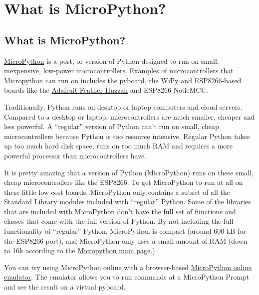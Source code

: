 \documentclass{book}
\begin{document}
    




    
        \section{What is MicroPython?}\label{what-is-micropython}
    




    
        \subsection{What is MicroPython?}\label{what-is-micropython}
    




    
        \href{http://micropython.org/}{MicroPython} is a port, or version of
Python designed to run on small, inexpensive, low-power
microcontrollers. Examples of microcontrollers that Micropython can run
on includes the \href{https://store.micropython.org/}{pyboard}, the
\href{https://pycom.io/development-boards}{WiPy} and ESP8266-based
boards like the
\href{https://learn.adafruit.com/adafruit-feather-huzzah-esp8266}{Adafruit
Feather Huzzah} and ESP8266 NodeMCU.

Traditionally, Python runs on desktop or laptop computers and cloud
servers. Compared to a desktop or laptop, microcontrollers are much
smaller, cheaper and less powerful. A ``regular'' version of Python
can't run on small, cheap microcontrollers because Python is too
resource intensive. Regular Python takes up too much hard disk space,
runs on too much RAM and requires a more powerful processor than
microcontrollers have.

It is pretty amazing that a version of Python (MicroPython) runs on
these small, cheap microcontrollers like the ESP8266. To get MicroPython
to run at all on these little low-cost boards, MicroPython only contains
a subset of all the Standard Library modules included with ``regular''
Python. Some of the libraries that are included with MicroPython don't
have the full set of functions and classes that come with the full
version of Python. By not including the full functionality of
``regular'' Python, MicroPython is compact (around 600 kB for the
ESP8266 port), and MicroPython only uses a small amount of RAM (down to
16k according to the \href{https://micropython.org/}{Micropython main
page}.)

You can try using MicroPython online with a browser-based
\href{https://micropython.org/unicorn/}{MicroPython online emulator}.
The emulator allows you to run commands at a MicroPython Prompt and see
the result on a virtual pyboard.
    
\end{document}
